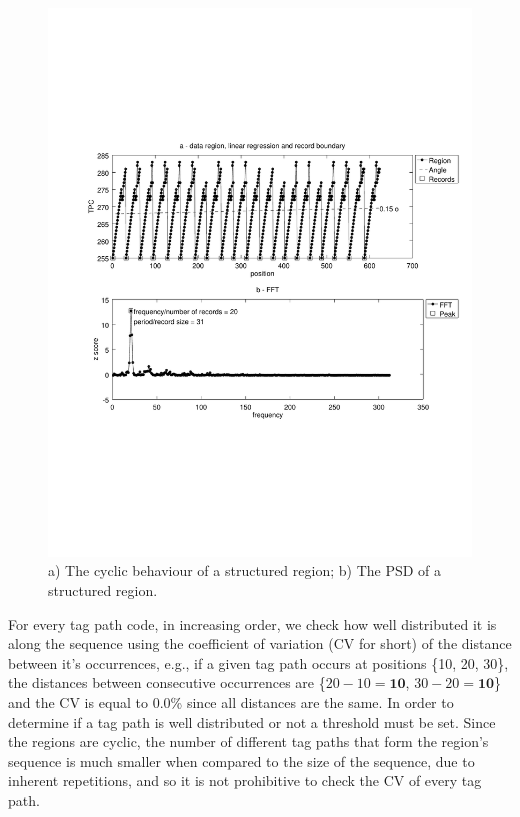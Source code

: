 \documentclass{vldb}
\begin{document}
\begin{figure}[h]
  \centering
     \includegraphics[trim={2.5cm 7.5cm 1cm 6.5cm}, width=\linewidth
     ]{img/fftreg.pdf}
  \caption{a) The cyclic behaviour of a structured region; b) The PSD of a
  structured region.}
  \label{fig:fftreg}
\end{figure}

For every tag path code, in increasing order, we check how well distributed it
is along the sequence using the coefficient of variation (CV for short) of the
distance between it's occurrences, e.g., if a given tag path occurs at positions
\{10, 20, 30\}, the distances between consecutive occurrences are \{$20-10 =
\textbf{10}$, $30-20 = \textbf{10}$\} and the CV is equal to 0.0\% since all
distances are the same. In order to determine if a tag path is well distributed or not a threshold
must be set. Since the regions are cyclic, the number of different tag paths
that form the region's sequence is much smaller when compared to the size of the
sequence, due to inherent repetitions, and so it is not prohibitive to check the
CV of every tag path.
\end{document}
